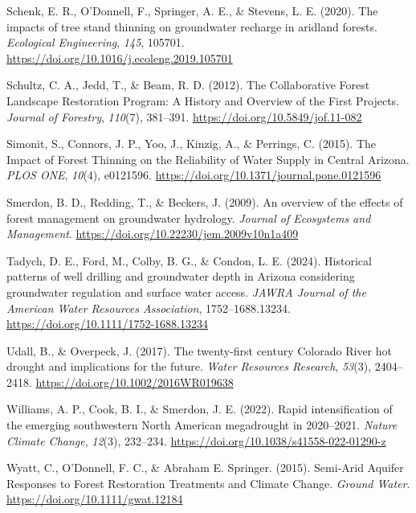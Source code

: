 \documentclass[
]{agujournal2019}
\newlength{\cslhangindent}
\newenvironment{CSLReferences}[2] %
 {\begin{list}{}{%
  \setlength{\itemindent}{0pt}
  \setlength{\leftmargin}{0pt}
  \setlength{\parsep}{0pt}
  \ifodd #1
   \setlength{\leftmargin}{\cslhangindent}
   \setlength{\itemindent}{-1\cslhangindent}
  \fi
  \setlength{\itemsep}{#2\baselineskip}}}
 {\end{list}}
\begin{document}
\begin{CSLReferences}{1}{0}
Schenk, E. R., O'Donnell, F., Springer, A. E., \& Stevens, L. E. (2020).
The impacts of tree stand thinning on groundwater recharge in aridland
forests. \emph{Ecological Engineering}, \emph{145}, 105701.
\url{https://doi.org/10.1016/j.ecoleng.2019.105701}

Schultz, C. A., Jedd, T., \& Beam, R. D. (2012). The {Collaborative}
{Forest} {Landscape} {Restoration} {Program}: {A} {History} and
{Overview} of the {First} {Projects}. \emph{Journal of Forestry},
\emph{110}(7), 381--391. \url{https://doi.org/10.5849/jof.11-082}

Simonit, S., Connors, J. P., Yoo, J., Kinzig, A., \& Perrings, C.
(2015). The {Impact} of {Forest} {Thinning} on the {Reliability} of
{Water} {Supply} in {Central} {Arizona}. \emph{PLOS ONE}, \emph{10}(4),
e0121596. \url{https://doi.org/10.1371/journal.pone.0121596}

Smerdon, B. D., Redding, T., \& Beckers, J. (2009). An overview of the
effects of forest management on groundwater hydrology. \emph{Journal of
Ecosystems and Management}.
\url{https://doi.org/10.22230/jem.2009v10n1a409}

Tadych, D. E., Ford, M., Colby, B. G., \& Condon, L. E. (2024).
Historical patterns of well drilling and groundwater depth in {Arizona}
considering groundwater regulation and surface water access. \emph{JAWRA
Journal of the American Water Resources Association}, 1752--1688.13234.
\url{https://doi.org/10.1111/1752-1688.13234}

Udall, B., \& Overpeck, J. (2017). The twenty‐first century {Colorado}
{River} hot drought and implications for the future. \emph{Water
Resources Research}, \emph{53}(3), 2404--2418.
\url{https://doi.org/10.1002/2016WR019638}

Williams, A. P., Cook, B. I., \& Smerdon, J. E. (2022). Rapid
intensification of the emerging southwestern {North} {American}
megadrought in 2020--2021. \emph{Nature Climate Change}, \emph{12}(3),
232--234. \url{https://doi.org/10.1038/s41558-022-01290-z}

Wyatt, C., O'Donnell, F. C., \& Abraham E. Springer. (2015). Semi‐{Arid}
{Aquifer} {Responses} to {Forest} {Restoration} {Treatments} and
{Climate} {Change}. \emph{Ground Water}.
\url{https://doi.org/10.1111/gwat.12184}


\end{CSLReferences}
\end{document}

